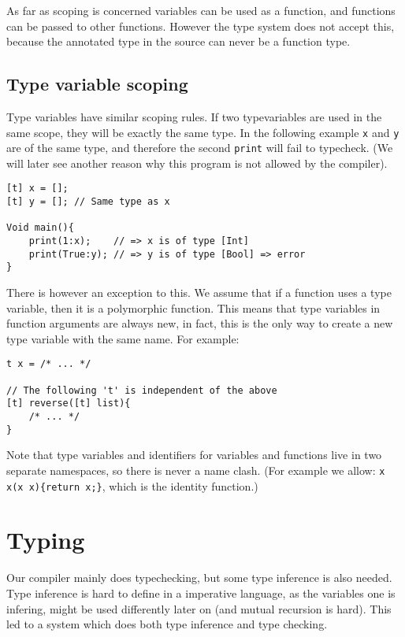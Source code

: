 \documentclass[14pt]{amsart}
\begin{document}
As far as scoping is concerned variables can be used as a function, and functions can be passed to other functions. However the type system does not accept this, because the annotated type in the source can never be a function type.

\subsection{Type variable scoping}
Type variables have similar scoping rules. If two typevariables are used in the same scope, they will be exactly the same type. In the following example \texttt{x} and \texttt{y} are of the same type, and therefore the second \texttt{print} will fail to typecheck. (We will later see another reason why this program is not allowed by the compiler).

\begin{lstlisting}
[t] x = [];
[t] y = []; // Same type as x

Void main(){
	print(1:x);    // => x is of type [Int]
	print(True:y); // => y is of type [Bool] => error
}
\end{lstlisting}

There is however an exception to this. We assume that if a function uses a type variable, then it is a polymorphic function. This means that type variables in function arguments are always new, in fact, this is the only way to create a new type variable with the same name. For example:

\begin{lstlisting}
t x = /* ... */

// The following 't' is independent of the above
[t] reverse([t] list){
	/* ... */
}
\end{lstlisting}

Note that type variables and identifiers for variables and functions live in two separate namespaces, so there is never a name clash. (For example we allow: \texttt{x x(x x)\{return x;\}}, which is the identity function.)

\section{Typing}

Our compiler mainly does typechecking, but some type inference is also needed. Type inference is hard to define in a imperative language, as the variables one is infering, might be used differently later on (and mutual recursion is hard). This led to a system which does both type inference and type checking.
\end{document}
